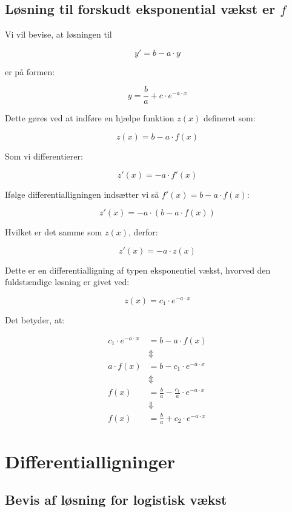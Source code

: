 \documentclass{article}
\makeatletter
\newenvironment{proofw}{\par
  \pushQED{\qed}%
  \normalfont \topsep6\p@\@plus6\p@\relax
  \trivlist
  \item[]\ignorespaces
}{%
  \popQED\endtrivlist\@endpefalse
}
\makeatother
\begin{document}
\subsection{Løsning til forskudt eksponential vækst er $f$}

\begin{proofw}
    
Vi vil bevise, at løsningen til 

$$y'=b-a\cdot y$$

er på formen:

$$
    y=\frac{b}{a}+c\cdot e^{-a \cdot x}
$$

Dette gøres ved at indføre en hjælpe funktion $z(x)$ defineret som:

$$
    z(x)=b-a\cdot f(x)
$$

Som vi differentierer:

$$
    z'(x)=-a\cdot f'(x)
$$

Ifølge differentialligningen indsætter vi så $f'(x)=b-a\cdot f(x)$:

$$
    z'(x)=-a\cdot (b-a \cdot f(x))
$$

Hvilket er det samme som $z(x)$, derfor:

$$
    z'(x)=-a\cdot z(x)
$$

Dette er en differentialligning af typen eksponentiel vækst,
hvorved den fuldstændige løsning er givet ved:

$$
    z(x)=c_1\cdot e^{-a\cdot x}
$$

Det betyder, at:

\begin{align*}
    c_1\cdot e^{-a\cdot x}&=b-a\cdot f(x)
    \\
    &\Updownarrow
    \\
    a\cdot f(x)&=b-c_1\cdot e^{-a\cdot x}
     \\
    &\Updownarrow
    \\
    f(x)&=\frac{b}{a}-\frac{c_1}{a}\cdot e^{-a\cdot x}
    \\
    &\Downarrow
    \\
    f(x)&=\frac{b}{a}+c_2\cdot e^{-a\cdot x}
\end{align*}

\end{proofw}

\section{Differentialligninger}

\subsection{Bevis af løsning for logistisk vækst}
\end{document}
